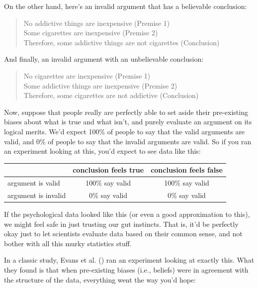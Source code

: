 \documentclass[
  11pt,
  a4paper,
  twoside,symmetric,openright]{book}
\theoremstyle{break}
\theoremstyle{break}
\begin{document}
On the other hand, here's an invalid argument that has a believable conclusion:

\begin{quote}
No addictive things are inexpensive (Premise 1)\\
Some cigarettes are inexpensive (Premise 2)\\
Therefore, some addictive things are not cigarettes (Conclusion)
\end{quote}

And finally, an invalid argument with an unbelievable conclusion:

\begin{quote}
No cigarettes are inexpensive (Premise 1)\\
Some addictive things are inexpensive (Premise 2)\\
Therefore, some cigarettes are not addictive (Conclusion)
\end{quote}

Now, suppose that people really are perfectly able to set aside their pre-existing biases about what is true and what isn't, and purely evaluate an argument on its logical merits. We'd expect 100\% of people to say that the valid arguments are valid, and 0\% of people to say that the invalid arguments are valid. So if you ran an experiment looking at this, you'd expect to see data like this:

\begin{table}[H]
\centering
\begin{tabular}{lcc}
\toprule
  & conclusion feels true & conclusion feels false\\
\midrule
argument is valid & 100\% say valid & 100\% say valid\\
argument is invalid & 0\% say valid & 0\% say valid\\
\bottomrule
\end{tabular}
\end{table}

If the psychological data looked like this (or even a good approximation to this), we might feel safe in just trusting our gut instincts. That is, it'd be perfectly okay just to let scientists evaluate data based on their common sense, and not bother with all this murky statistics stuff.

In a classic study, Evans et al. () ran an experiment looking at exactly this. What they found is that when pre-existing biases (i.e., beliefs) were in agreement with the structure of the data, everything went the way you'd hope:
\end{document}
